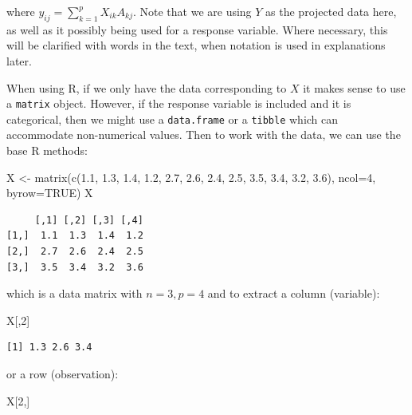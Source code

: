\documentclass[
  letterpaper,
]{krantz}
\newenvironment{Shaded}{\begin{snugshade}}{\end{snugshade}}
\newcommand{\AttributeTok}[1]{\textcolor[rgb]{0.40,0.45,0.13}{#1}}
\newcommand{\ConstantTok}[1]{\textcolor[rgb]{0.56,0.35,0.01}{#1}}
\newcommand{\DecValTok}[1]{\textcolor[rgb]{0.68,0.00,0.00}{#1}}
\newcommand{\FloatTok}[1]{\textcolor[rgb]{0.68,0.00,0.00}{#1}}
\newcommand{\FunctionTok}[1]{\textcolor[rgb]{0.28,0.35,0.67}{#1}}
\newcommand{\NormalTok}[1]{\textcolor[rgb]{0.00,0.23,0.31}{#1}}
\newcommand{\OtherTok}[1]{\textcolor[rgb]{0.00,0.23,0.31}{#1}}
\begin{document}
where \(y_{ij} = \sum_{k=1}^p X_{ik}A_{kj}\). Note that we are using
\(Y\) as the projected data here, as well as it possibly being used for
a response variable. Where necessary, this will be clarified with words
in the text, when notation is used in explanations later.

When using R, if we only have the data corresponding to \(X\) it makes
sense to use a \texttt{matrix} object. However, if the response variable
is included and it is categorical, then we might use a
\texttt{data.frame} or a \texttt{tibble} which can accommodate
non-numerical values. Then to work with the data, we can use the base R
methods:

\begin{Shaded}
\begin{Highlighting}[]
\NormalTok{X }\OtherTok{\textless{}{-}} \FunctionTok{matrix}\NormalTok{(}\FunctionTok{c}\NormalTok{(}\FloatTok{1.1}\NormalTok{, }\FloatTok{1.3}\NormalTok{, }\FloatTok{1.4}\NormalTok{, }\FloatTok{1.2}\NormalTok{, }
              \FloatTok{2.7}\NormalTok{, }\FloatTok{2.6}\NormalTok{, }\FloatTok{2.4}\NormalTok{, }\FloatTok{2.5}\NormalTok{, }
              \FloatTok{3.5}\NormalTok{, }\FloatTok{3.4}\NormalTok{, }\FloatTok{3.2}\NormalTok{, }\FloatTok{3.6}\NormalTok{), }
            \AttributeTok{ncol=}\DecValTok{4}\NormalTok{, }\AttributeTok{byrow=}\ConstantTok{TRUE}\NormalTok{)}
\NormalTok{X}
\end{Highlighting}
\end{Shaded}

\begin{verbatim}
     [,1] [,2] [,3] [,4]
[1,]  1.1  1.3  1.4  1.2
[2,]  2.7  2.6  2.4  2.5
[3,]  3.5  3.4  3.2  3.6
\end{verbatim}

which is a data matrix with \(n=3, p=4\) and to extract a column
(variable):

\begin{Shaded}
\begin{Highlighting}[]
\NormalTok{X[,}\DecValTok{2}\NormalTok{]}
\end{Highlighting}
\end{Shaded}

\begin{verbatim}
[1] 1.3 2.6 3.4
\end{verbatim}

or a row (observation):

\begin{Shaded}
\begin{Highlighting}[]
\NormalTok{X[}\DecValTok{2}\NormalTok{,]}
\end{Highlighting}
\end{Shaded}
\end{document}
